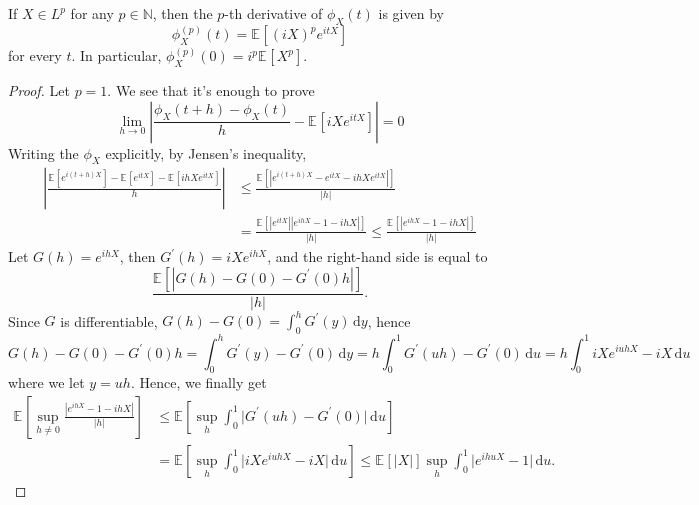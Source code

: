 \begin{theorem}
	If \(X \in L ^p\) for any \(p \in \mathbb{N} \), then the \(p\)-th derivative of \(\phi _X(t)\) is given by
	\[
		\phi _X^{(p)} (t) = \mathbb{E}_{}[(iX)^p e^{itX}]
	\]
	for every \(t\). In particular, \(\phi _X^{(p)}(0) = i^p \mathbb{E}_{}[X^p] \).
\end{theorem}
\begin{proof}
	Let \(p = 1\). We see that it's enough to prove
	\[
		\lim_{h \to 0} \left\vert \frac{\phi _X(t + h) - \phi _X(t)}{h} - \mathbb{E}_{}\left[i X e^{itX}\right] \right\vert = 0
	\]
	Writing the \(\phi _X\) explicitly, by Jensen's inequality,
	\[
		\begin{split}
			\left\vert \frac{\mathbb{E}_{}\left[e^{i(t + h) X}\right] - \mathbb{E}_{}\left[e^{itX}\right] - \mathbb{E}_{}\left[ihX e^{itX}\right] }{h} \right\vert
			 & \leq \frac{\mathbb{E}_{}\left[\left\vert e^{i(t + h) X} - e^{itX} - ihX e^{itX} \right\vert \right] }{\vert h \vert }             \\
			 & = \frac{\mathbb{E}_{}\left[\left\vert e^{i t X}  \right\vert \left\vert e^{i h X} - 1 - ihX \right\vert \right] }{\vert h \vert }
			\leq \frac{\mathbb{E}_{}\left[\left\vert e^{i h X} - 1 - ihX \right\vert \right] }{\vert h \vert }
		\end{split}
	\]
	Let \(G(h) = e^{ihX}\), then \(G^{\prime} (h) = iX e^{ihX}\), and the right-hand side is equal to
	\[
		\frac{\mathbb{E}_{}\left[\left\vert G(h) - G(0) - G^{\prime} (0) h \right\vert \right]}{\vert h \vert } .
	\]
	Since \(G\) is differentiable, \(G(h)-G(0) = \int_{0}^{h} G^{\prime} (y) \,\mathrm{d}y \), hence
	\[
		G(h) - G(0) - G^{\prime} (0) h
		= \int_{0}^{h} G^{\prime} (y) - G^{\prime} (0) \,\mathrm{d}y
		= h \int_{0}^{1} G^{\prime} (uh) - G^{\prime} (0) \,\mathrm{d}u
		= h \int_{0}^{1} iX e^{iuhX} - iX \,\mathrm{d}u
	\]
	where we let \(y = u h\). Hence, we finally get
	\[
		\begin{split}
			\mathbb{E}_{}\left[\sup _{h \neq 0} \frac{\left\vert e^{ihX} - 1 - ihX \right\vert }{\vert h \vert }\right]
			 & \leq \mathbb{E}_{}\left[\sup _{h} \int_{0}^{1} \vert G^{\prime} (uh) - G^{\prime} (0) \vert \,\mathrm{d}u \right] \\
			 & = \mathbb{E}_{}\left[\sup _{h} \int_{0}^{1} \vert iX e^{iuhX} - iX \vert \,\mathrm{d}u \right]
			\leq \mathbb{E}_{}[\vert X \vert ] \sup _{h} \int_{0}^{1} \vert e^{ihuX} - 1 \vert \,\mathrm{d}u .
		\end{split}
	\]
\end{proof}